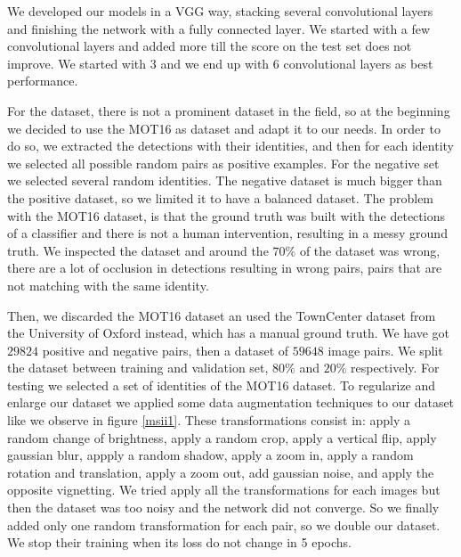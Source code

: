 
We developed our models in a VGG way, stacking  several convolutional layers and finishing the network with a fully connected layer. We started with a few convolutional layers and added more till the score on the test set does not improve. We started with $3$ and we end up with $6$ convolutional layers as best performance.

For the dataset, there is not a prominent dataset in the field, so at the beginning we decided to use the MOT16 as dataset and adapt it to our needs. In order to do so, we extracted the detections with their identities, and then for each identity we selected all possible random pairs as positive examples. For the negative set we selected several random identities. The negative dataset is much bigger than the positive dataset, so we limited it to have a balanced dataset. The problem with the MOT16 dataset, is that the ground truth was built with the detections of a classifier and there is not a human intervention, resulting in a messy ground truth. We inspected the dataset and around the $70 \%$ of the dataset was wrong, there are a lot of occlusion in detections resulting in wrong pairs, pairs that are not matching with the same identity.

Then, we discarded the MOT16 dataset an used the TownCenter dataset \cite{townCenter} from the University of Oxford instead, which has a manual ground truth. We have got $29824$ positive and negative pairs, then a dataset of $59648$ image pairs. We split the dataset between training and validation set, $80 \%$ and $20 \%$ respectively. For testing we selected a set of identities of the MOT16 dataset. To regularize and enlarge our dataset we applied some data augmentation techniques to our dataset like we observe in figure \ref{msii1}. These transformations consist in: apply a random change of brightness, apply a random crop, apply a vertical flip, apply gaussian blur, appply a random shadow, apply a zoom in, apply a random rotation and translation, apply a zoom out, add gaussian noise, and apply the opposite vignetting. We tried apply all the transformations for each images but then the dataset was too noisy and the network did not converge. So we finally added only one random transformation for each pair, so we double our dataset. We stop their training when its loss do not change in 5 epochs.






